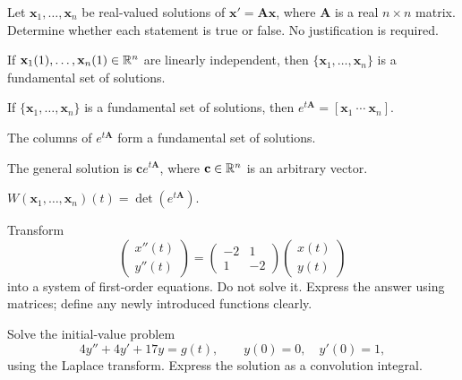 \documentclass[11pt,oneside]{article}
\begin{document}
\begin{problem}
Let $\mathbf x_1,\dots,\mathbf x_n$ be real-valued solutions of $\mathbf x'=\mathbf A\mathbf x$, where $\mathbf A$ is a real $n\times n$ matrix. Determine whether each statement is true or false. No justification is required.
\begin{problemchoices}
\item If $\mathbf x_1(1),\dots,\mathbf x_n(1)\in\mathbb{R}^n$ are linearly independent, then $\{\mathbf x_1,\dots,\mathbf x_n\}$ is a fundamental set of solutions.
\item If $\{\mathbf x_1,\dots,\mathbf x_n\}$ is a fundamental set of solutions, then $e^{t\mathbf A}=[\mathbf x_1\ \cdots\ \mathbf x_n]$.
\item The columns of $e^{t\mathbf A}$ form a fundamental set of solutions.
\item The general solution is $\mathbf c e^{t\mathbf A}$, where $\mathbf c\in\mathbb{R}^n$ is an arbitrary vector.
\item $W(\mathbf x_1,\dots,\mathbf x_n)(t)=\det(e^{t\mathbf A})$.
\end{problemchoices}
\end{problem}

\begin{problem}
Transform
\[\begin{pmatrix}x''(t)\\y''(t)\end{pmatrix}=\begin{pmatrix}-2&1\\1&-2\end{pmatrix}\begin{pmatrix}x(t)\\y(t)\end{pmatrix}\]
into a system of first-order equations. Do not solve it. Express the answer using matrices; define any newly introduced functions clearly.
\end{problem}

\begin{problem}
Solve the initial-value problem
\[4y''+4y'+17y=g(t),\qquad y(0)=0,\quad y'(0)=1,\]
using the Laplace transform. Express the solution as a convolution integral.
\end{problem}
\end{document}
